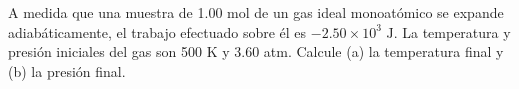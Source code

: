 \item A medida que una muestra de 1.00 mol de un gas ideal monoatómico se expande adiabáticamente, el trabajo efectuado sobre él es $-2.50 \times 10^3\text{ J}$. La temperatura y presión iniciales del gas son 500 K y 3.60 atm. Calcule (a) la temperatura final y (b) la presión final.
